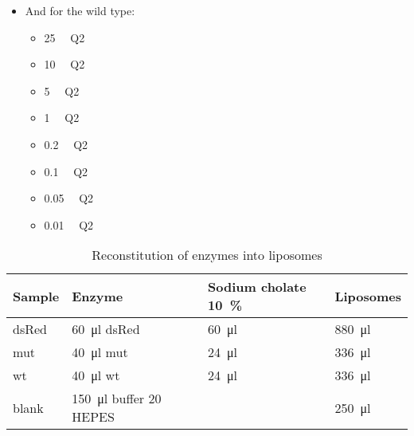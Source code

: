 \begin{itemize}
\begin{itemize}
		\end{itemize}
	\item And for the wild type:
		\begin{itemize}
			\item \SI{25}{\micro\Molar} Q2
			\item \SI{10}{\micro\Molar} Q2
			\item \SI{5}{\micro\Molar} Q2
			\item \SI{1}{\micro\Molar} Q2
			\item \SI{0.2}{\micro\Molar} Q2
			\item \SI{0.1}{\micro\Molar} Q2
			\item \SI{0.05}{\micro\Molar} Q2
			\item \SI{0.01}{\micro\Molar} Q2
		\end{itemize}
\end{itemize}

\begin{table}
	\centering
	\begin{tabu}{llll}
		\toprule
		Sample & Enzyme & Sodium cholate \SI{10}{\percent} & Liposomes \\
		\midrule
		dsRed & \SI{60}{\ul} dsRed & \SI{60}{\ul} & \SI{880}{\ul} \\
		mut & \SI{40}{\ul} mut & \SI{24}{\ul} & \SI{336}{\ul} \\
		wt & \SI{40}{\ul} wt & \SI{24}{\ul} & \SI{336}{\ul} \\
		blank & \SI{150}{\ul} buffer \SI{20}{\milli\Molar} HEPES & & \SI{250}{\ul} \\
		\bottomrule
	\end{tabu}
	\caption{Reconstitution of enzymes into liposomes}
	\label{tbl:hs_reconstitution}
\end{table}

